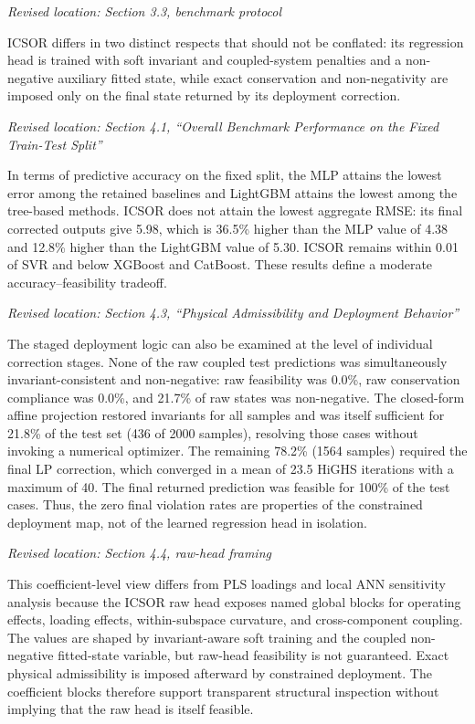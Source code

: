 \documentclass[11pt,a4paper]{article}
\newcommand{\excerptlocation}[1]{\par\noindent\textit{Revised location: #1}\par}
\begin{document}
\excerptlocation{Section 3.3, benchmark protocol}
\begin{revisionexcerpt}
ICSOR differs in two distinct respects that should not be conflated: its regression head is trained with soft invariant and coupled-system penalties and a non-negative auxiliary fitted state, while exact conservation and non-negativity are imposed only on the final state returned by its deployment correction.
\end{revisionexcerpt}

\excerptlocation{Section 4.1, ``Overall Benchmark Performance on the Fixed Train-Test Split''}
\begin{revisionexcerpt}
In terms of predictive accuracy on the fixed split, the MLP attains the lowest error among the retained baselines and LightGBM attains the lowest among the tree-based methods. ICSOR does not attain the lowest aggregate RMSE: its final corrected outputs give 5.98, which is 36.5\% higher than the MLP value of 4.38 and 12.8\% higher than the LightGBM value of 5.30. ICSOR remains within 0.01 of SVR and below XGBoost and CatBoost. These results define a moderate accuracy--feasibility tradeoff.
\end{revisionexcerpt}

\excerptlocation{Section 4.3, ``Physical Admissibility and Deployment Behavior''}
\begin{revisionexcerpt}
The staged deployment logic can also be examined at the level of individual correction stages. None of the raw coupled test predictions was simultaneously invariant-consistent and non-negative: raw feasibility was 0.0\%, raw conservation compliance was 0.0\%, and 21.7\% of raw states was non-negative. The closed-form affine projection restored invariants for all samples and was itself sufficient for 21.8\% of the test set (436 of 2000 samples), resolving those cases without invoking a numerical optimizer. The remaining 78.2\% (1564 samples) required the final LP correction, which converged in a mean of 23.5 HiGHS iterations with a maximum of 40. The final returned prediction was feasible for 100\% of the test cases. Thus, the zero final violation rates are properties of the constrained deployment map, not of the learned regression head in isolation.
\end{revisionexcerpt}

\excerptlocation{Section 4.4, raw-head framing}
\begin{revisionexcerpt}
This coefficient-level view differs from PLS loadings and local ANN sensitivity analysis because the ICSOR raw head exposes named global blocks for operating effects, loading effects, within-subspace curvature, and cross-component coupling. The values are shaped by invariant-aware soft training and the coupled non-negative fitted-state variable, but raw-head feasibility is not guaranteed. Exact physical admissibility is imposed afterward by constrained deployment. The coefficient blocks therefore support transparent structural inspection without implying that the raw head is itself feasible.
\end{revisionexcerpt}
\end{document}
